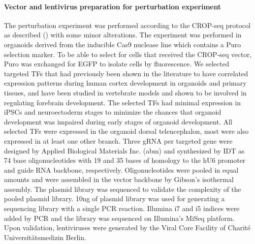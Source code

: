 \paragraph{Vector and lentivirus preparation for perturbation experiment}
The perturbation experiment was performed according to the CROP-seq protocol as described (\cite{datlinger_pooled_2017}) with some minor alterations. The experiment was performed in organoids derived from the inducible Cas9 nuclease line which contains a Puro selection marker. To be able to select for cells that received the CROP-seq vector, Puro was exchanged for EGFP to isolate cells by fluorescence. We selected targeted TFs that had previously been shown in the literature to have correlated expression patterns during human cortex development in organoids and primary tissues, and have been studied in vertebrate models and shown to be involved in regulating forebrain development. The selected TFs had minimal expression in iPSCs and neuroectoderm stages to minimize the chances that organoid development was impaired during early stages of organoid development. All selected TFs were expressed in the organoid dorsal telencephalon, most were also expressed in at least one other branch. Three gRNA per targeted gene were designed by Applied Biological Materials Inc. (abm) and synthesized by IDT as 74 base oligonucleotides with 19 and 35 bases of homology to the hU6 promoter and guide RNA backbone, respectively. Oligonucleotides were pooled in equal amounts and were assembled in the vector backbone by Gibson’s isothermal assembly. The plasmid library was sequenced to validate the complexity of the pooled plasmid library. 10ng of plasmid library was used for generating a sequencing library with a single PCR reaction. Illumina i7 and i5 indices were added by PCR and the library was sequenced on Illumina’s MiSeq platform. Upon validation, lentiviruses were generated by the Viral Core Facility of Charité Universitätsmedizin Berlin.
 
